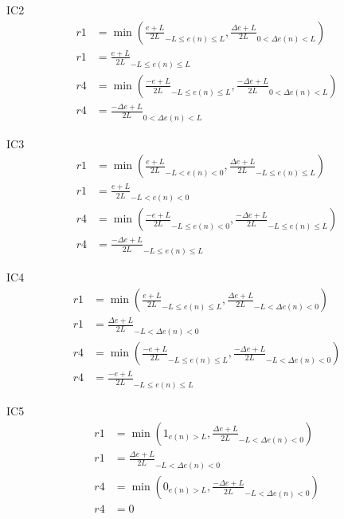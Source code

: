 IC2
\begin{equation}
\begin{split}
    r1&=\min{\left(\frac{e+L}{2L}_{-L\leq e(n)\leq L},\frac{\Delta e+L}{2L}_{0<\Delta e(n)<L}\right)}\\
    r1&=\frac{e+L}{2L}_{-L\leq e(n)\leq L}\\
    r4&=\min{\left(\frac{-e+L}{2L}_{-L\leq e(n)\leq L},\frac{-\Delta e+L}{2L}_{0<\Delta e(n)<L}\right)}\\
    r4&=\frac{-\Delta e+L}{2L}_{0<\Delta e(n)<L}
\end{split}
\end{equation}


IC3
\begin{equation}
\begin{split}
    r1&=\min{\left(\frac{e+L}{2L}_{-L<e(n)<0},\frac{\Delta e+L}{2L}_{-L\leq e(n)\leq L}\right)}\\
    r1&=\frac{e+L}{2L}_{-L<e(n)<0}\\
    r4&=\min{\left(\frac{-e+L}{2L}_{-L\leq e(n)<0},\frac{-\Delta e+L}{2L}_{-L\leq e(n)\leq L}\right)}\\
    r4&=\frac{-\Delta e+L}{2L}_{-L\leq e(n)\leq L}
\end{split}
\end{equation}

IC4
\begin{equation}
\begin{split}
    r1&=\min{\left(\frac{e+L}{2L}_{-L\leq e(n)\leq L},\frac{\Delta e+L}{2L}_{-L<\Delta e(n)<0}\right)}\\
    r1&=\frac{\Delta e+L}{2L}_{-L<\Delta e(n)<0}\\
    r4&=\min{\left(\frac{-e+L}{2L}_{-L\leq e(n)\leq L},\frac{-\Delta e+L}{2L}_{-L<\Delta e(n)<0}\right)}\\
    r4&=\frac{-e+L}{2L}_{-L\leq e(n)\leq L}
\end{split}
\end{equation}

IC5
\begin{equation}
\begin{split}
    r1&=\min{\left(1_{e(n)>L},\frac{\Delta e+L}{2L}_{-L<\Delta e(n)<0}\right)}\\
    r1&=\frac{\Delta e+L}{2L}_{-L<\Delta e(n)<0}\\
    r4&=\min{\left(0_{e(n)>L},\frac{-\Delta e+L}{2L}_{-L<\Delta e(n)<0}\right)}\\
    r4&=0
\end{split}
\end{equation}

